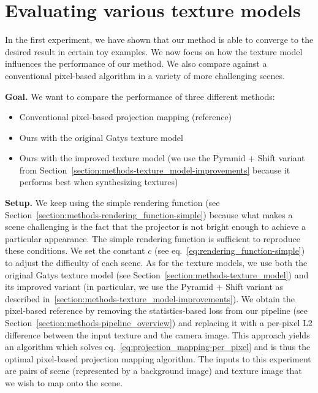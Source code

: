 \section{Evaluating various texture models}
\label{section:results-experiments-02}

In the first experiment, we have shown that our method is able to converge to the desired result in certain toy examples. We now focus on how the texture model influences the performance of our method. We also compare against a conventional pixel-based algorithm in a variety of more challenging scenes.

\textbf{Goal.} We want to compare the performance of three different methods:

\begin{itemize}
    \item Conventional pixel-based projection mapping (reference)
    \item Ours with the original Gatys texture model
    \item Ours with the improved texture model (we use the Pyramid + Shift variant from Section~\ref{section:methods-texture_model-improvements} because it performs best when synthesizing textures)
\end{itemize}

\textbf{Setup.} We keep using the simple rendering function (see Section~\ref{section:methods-rendering_function-simple}) because what makes a scene challenging is the fact that the projector is not bright enough to achieve a particular appearance. The simple rendering function is sufficient to reproduce these conditions. We set the constant \(c\) (see eq.~\ref{eq:rendering_function-simple}) to adjust the difficulty of each scene. As for the texture models, we use both the original Gatys texture model (see Section~\ref{section:methods-texture_model}) and its improved variant (in particular, we use the Pyramid + Shift variant as described in~\ref{section:methods-texture_model-improvements}). We obtain the pixel-based reference by removing the statistics-based loss from our pipeline (see Section~\ref{section:methods-pipeline_overview}) and replacing it with a per-pixel L2 difference between the input texture and the camera image. This approach yields an algorithm which solves eq.~\ref{eq:projection_mapping-per_pixel} and is thus the optimal pixel-based projection mapping algorithm. The inputs to this experiment are pairs of scene (represented by a background image) and texture image that we wish to map onto the scene.

